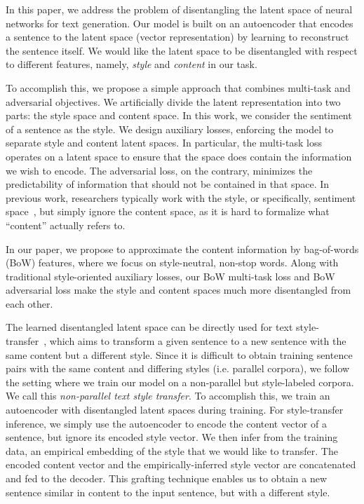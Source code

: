 \documentclass[letterpaper]{article} %
\begin{document}
In this paper, we address the problem of disentangling the latent space of neural networks for text generation.
Our model is built on an autoencoder that encodes a sentence to the latent space (vector representation) by learning to reconstruct the sentence itself.
We would like the latent space to be disentangled with respect to different features, namely, \textit{style} and \textit{content} in our task.

To accomplish this, we propose a simple approach that combines multi-task and adversarial objectives.
We artificially divide the latent representation into two parts: the style space and content space. In this work, we consider the sentiment of a sentence as the style.
We design auxiliary losses, enforcing the model to separate style and content latent spaces.
In particular, the multi-task loss operates on a latent space to ensure that the space does contain the information we wish to encode.
The adversarial loss, on the contrary, minimizes the predictability of information that should not be contained in that space.
In previous work, researchers typically work with the style, or specifically, sentiment space~\cite{hu2017toward,shen2017style,fu2018style}, but simply ignore the content space, as it is hard to formalize what ``content'' actually refers to.

In our paper, we propose to approximate the content information by bag-of-words (BoW) features, where we focus on style-neutral, non-stop words.
Along with traditional style-oriented auxiliary losses, our BoW multi-task loss and BoW adversarial loss make the style and content spaces much more disentangled from each other.

The learned disentangled latent space can be directly used for text style-transfer~\cite{hu2017toward,shen2017style}, which aims to transform a given sentence to a new sentence with the same content but a different style.
Since it is difficult to obtain training sentence pairs with the same content and differing styles (i.e. parallel corpora), we follow the setting where we train our model on a non-parallel but style-labeled corpora. We call this \textit{non-parallel text style transfer}.
To accomplish this, we train an autoencoder with disentangled latent spaces during training.
For style-transfer inference, we simply use the autoencoder to encode the content vector of a sentence, but ignore its encoded style vector.
We then infer from the training data, an empirical embedding of the style that we would like to transfer.
The encoded content vector and the empirically-inferred style vector are concatenated and fed to the decoder.
This grafting technique enables us to obtain a new sentence similar in content to the input sentence, but with a different style.
\end{document}
